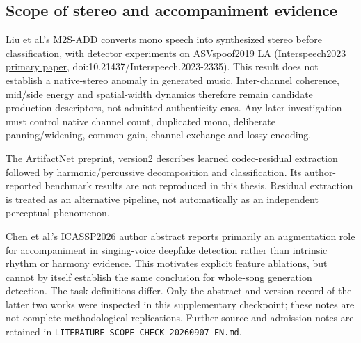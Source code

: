 \subsection{Scope of stereo and accompaniment evidence}
Liu et al.'s M2S-ADD converts mono speech into synthesized stereo before
classification, with detector experiments on ASVspoof2019 LA
(\href{https://www.isca-archive.org/interspeech_2023/liu23v_interspeech.pdf}{Interspeech2023 primary paper},
doi:10.21437/Interspeech.2023-2335).
This result does not establish a native-stereo anomaly in generated music.
Inter-channel coherence, mid/side energy and spatial-width dynamics therefore
remain candidate production descriptors, not admitted authenticity cues.
Any later investigation must control native channel count, duplicated mono,
deliberate panning/widening, common gain, channel exchange and lossy encoding.

The \href{https://arxiv.org/abs/2604.16254v2}{ArtifactNet preprint, version2}
describes learned codec-residual extraction followed by harmonic/percussive
decomposition and classification. Its author-reported benchmark results are
not reproduced in this thesis. Residual extraction is treated as an alternative
pipeline, not automatically as an independent perceptual phenomenon.

Chen et al.'s \href{https://research.nvidia.com/labs/twn/publication/icassp_2026_singfakeinstrumental/}{ICASSP2026 author abstract}
reports primarily an augmentation role for accompaniment in singing-voice
deepfake detection rather than intrinsic rhythm or harmony evidence. This
motivates explicit feature ablations, but cannot by itself establish the same
conclusion for whole-song generation detection. The task definitions differ.
Only the abstract and version record of the latter two works were inspected
in this supplementary checkpoint; these notes are not complete methodological
replications. Further source and admission notes are retained in
\texttt{LITERATURE\_SCOPE\_CHECK\_20260907\_EN.md}.
